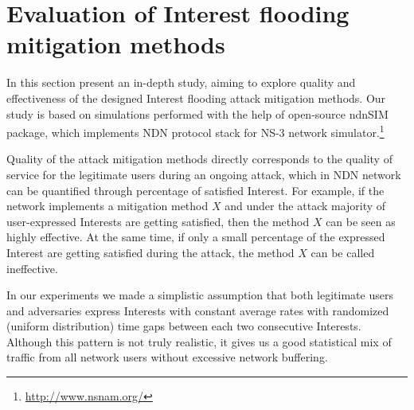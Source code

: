 \section{Evaluation of Interest flooding mitigation methods}
\label{sec:evaluation}




In this section present an in-depth study, aiming to explore quality and effectiveness of the designed Interest flooding attack mitigation methods.
Our study is based on simulations performed with the help of open-source ndnSIM~\cite{ndnsim} package, which implements NDN protocol stack for NS-3 network simulator.\footnote{\url{http://www.nsnam.org/}}


Quality of the attack mitigation methods directly corresponds to the quality of service for the legitimate users during an ongoing attack, which in NDN network can be quantified through percentage of satisfied Interest.
For example, if the network implements a mitigation method $X$ and under the attack majority of user-expressed Interests are getting satisfied, then the method $X$ can be seen as highly effective.
At the same time, if only a small percentage of the expressed Interest are getting satisfied during the attack, the method $X$ can be called ineffective. 

In our experiments we made a simplistic assumption that both legitimate users and adversaries express Interests with constant average rates with randomized (uniform distribution) time gaps between each two consecutive Interests.
Although this pattern is not truly realistic, it gives us a good statistical mix of traffic from all network users without excessive network buffering.

